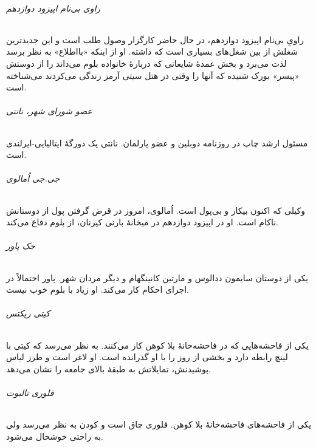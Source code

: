 \documentclass[12pt]{book}
\newcommand{\noun}[1]{\textit{\textcolor{black!70}{#1}}}
\begin{document}
    \paragraph{\noun{راوی بی‌نام اپیزود دوازدهم}}
    راویِ بی‌نام اپیزود دوازدهم، در حال حاضر کارگزار وصول طلب است و این جدیدترین شغلش از بین شغل‌های بسیاری است که داشته. او از اینکه «بااطلاع» به نظر برسد لذت می‌برد و بخش عمدۀ شایعاتی که دربارۀ خانواده بلوم می‌داند را از دوستش «پیسر» بورک شنیده که آنها را وقتی در هتل سیتی آرمز زندگی می‌کردند می‌شناخته است.
    \paragraph{\noun{عضو شورای شهر، نانتی}\protect{}}
    مسئول ارشد چاپ در روزنامه دوبلین و عضو پارلمان. نانتی یک دورگۀ ایتالیایی-ایرلندی است.
    \paragraph{\noun{جی.جی اُمالوی}\protect{}}
    وکیلی که اکنون بیکار و بی‌پول است. اُمالوی، امروز در قرض گرفتن پول از دوستانش ناکام است. او در اپیزود دوازدهم در میخانۀ بارنی کیرنان، از بلوم دفاع می‌کند.
    \paragraph{\noun{جک پاور}\protect{}}
    یکی از دوستان سایمون ددالوس و مارتین کانینگهام و دیگر مردان شهر. پاور احتمالاً در اجرای احکام کار می‌کند. او زیاد با بلوم خوب نیست.
    \paragraph{\noun{کیتی ریکتس}\protect{}}
    یکی از فاحشه‌هایی که در فاحشه‌خانۀ بلا کوهن کار می‌کنند. به نظر می‌رسد که کیتی با لینچ رابطه دارد و بخشی از روز را با او گذرانده است. او لاغر است و طرز لباس پوشیدنش، تمایلاتش به طبقۀ بالای جامعه را نشان می‌دهد.
    \paragraph{\noun{فلوری تالبوت}\protect{}}
    یکی از فاحشه‌های فاحشه‌خانۀ بلا کوهن. فلوری چاق است و کودن به نظر می‌رسد ولی به راحتی خوشحال می‌شود.

    \part{}
\end{document}
